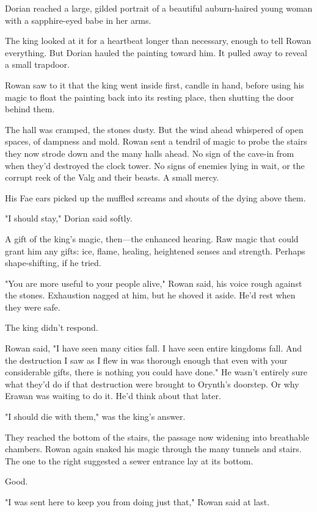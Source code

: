Dorian reached a large, gilded portrait of a beautiful auburn-haired young woman with a sapphire-eyed babe in her arms.

The king looked at it for a heartbeat longer than necessary, enough to tell Rowan everything. But Dorian hauled the painting toward him. It pulled away to reveal a small trapdoor.

Rowan saw to it that the king went inside first, candle in hand, before using his magic to float the painting back into its resting place, then shutting the door behind them.

The hall was cramped, the stones dusty. But the wind ahead whispered of open spaces, of dampness and mold. Rowan sent a tendril of magic to probe the stairs they now strode down and the many halls ahead. No sign of the cave-in from when they'd destroyed the clock tower. No signs of enemies lying in wait, or the corrupt reek of the Valg and their beasts. A small mercy.

His Fae ears picked up the muffled screams and shouts of the dying above them.

"I should stay," Dorian said softly.

A gift of the king's magic, then---the enhanced hearing. Raw magic that could grant him any gifts: ice, flame, healing, heightened senses and strength. Perhaps shape-shifting, if he tried.

"You are more useful to your people alive," Rowan said, his voice rough against the stones. Exhaustion nagged at him, but he shoved it aside. He'd rest when they were safe.

The king didn't respond.

Rowan said, "I have seen many cities fall. I have seen entire kingdoms fall. And the destruction I saw as I flew in was thorough enough that even with your considerable gifts, there is nothing you could have done." He wasn't entirely sure what they'd do if that destruction were brought to Orynth's doorstep. Or why Erawan was waiting to do it. He'd think about that later.

"I should die with them," was the king's answer.

They reached the bottom of the stairs, the passage now widening into breathable chambers. Rowan again snaked his magic through the many tunnels and stairs. The one to the right suggested a sewer entrance lay at its bottom.

Good.

"I was sent here to keep you from doing just that," Rowan said at last.

